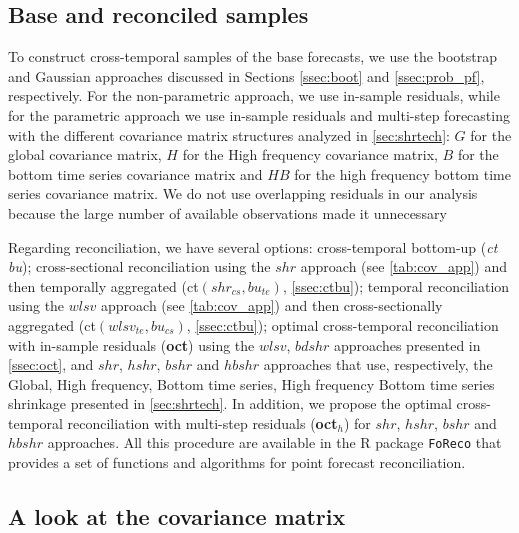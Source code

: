 \documentclass[a4paper,11pt]{article}
\theoremstyle{definition}
\begin{document}
\subsection{Base and reconciled samples}\label{ssec:sim_br}
To construct cross-temporal samples of the base forecasts, we use the bootstrap and Gaussian approaches discussed in Sections \ref{ssec:boot} and \ref{ssec:prob_pf}, respectively. For the non-parametric approach, we use in-sample residuals, while for the parametric approach we use in-sample residuals and multi-step forecasting with the different covariance matrix structures analyzed in \autoref{sec:shrtech}: $G$ for the global covariance matrix, $H$ for the High frequency covariance matrix, $B$ for the bottom time series covariance matrix and $HB$ for the high frequency bottom time series covariance matrix. We do not use overlapping residuals in our analysis because the large number of available observations made it unnecessary %

Regarding reconciliation, we have several options: cross-temporal bottom-up (\textit{ct bu}); cross-sectional reconciliation using the $shr$ approach (see \autoref{tab:cov_app}) and then temporally aggregated (ct$(shr_{cs}, bu_{te})$, \autoref{ssec:ctbu});  temporal reconciliation using the $wlsv$ approach (see \autoref{tab:cov_app}) and then cross-sectionally aggregated (ct$(wlsv_{te}, bu_{cs})$, \autoref{ssec:ctbu}); optimal cross-temporal reconciliation \citep{difonzo2023} with in-sample residuals (\textbf{oct}) using the $wlsv$, $bdshr$ approaches presented in \autoref{ssec:oct}, and $shr$, $hshr$, $bshr$ and $hbshr$ approaches that use, respectively, the Global, High frequency, Bottom time series, High frequency Bottom time series shrinkage presented in \autoref{sec:shrtech}. In addition, we propose the optimal cross-temporal reconciliation with multi-step residuals (\textbf{oct$_h$}) for $shr$, $hshr$, $bshr$ and $hbshr$ approaches. All this procedure are available in the \textsf{R} package \texttt{FoReco} \citep{girolimetto2022} that provides a set of functions and algorithms for point forecast reconciliation.

\subsection{A look at the covariance matrix}
\end{document}
